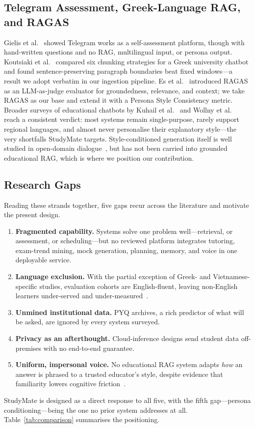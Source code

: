 \documentclass[conference]{IEEEtran}
\begin{document}
\subsection{Telegram Assessment, Greek-Language RAG, and RAGAS}
Gielis et al.~\cite{gielis2025} showed Telegram works as a
self-assessment platform, though with hand-written questions and no RAG,
multilingual input, or persona output. Koutsiaki et al.~\cite{koutsiaki2025}
compared six chunking strategies for a Greek university chatbot and
found sentence-preserving paragraph boundaries beat fixed windows---a
result we adopt verbatim in our ingestion pipeline. Es et al.~\cite{es2025}
introduced RAGAS as an LLM-as-judge evaluator for groundedness,
relevance, and context; we take RAGAS as our base and extend it with a
Persona Style Consistency metric. Broader surveys of educational
chatbots by Kuhail et al.~\cite{kuhail2023} and Wollny et al.~\cite{wollny2021}
reach a consistent verdict: most systems remain single-purpose, rarely
support regional languages, and almost never personalise their
explanatory style---the very shortfalls StudyMate targets.
Style-conditioned generation itself is well studied in open-domain
dialogue~\cite{li2023}, but has not been carried into grounded
educational RAG, which is where we position our contribution.

\subsection{Research Gaps}
Reading these strands together, five gaps recur across the literature
and motivate the present design.
\begin{enumerate}
    \item \textbf{Fragmented capability.} Systems solve one problem
          well---retrieval, or assessment, or scheduling---but no
          reviewed platform integrates tutoring, exam-trend mining,
          mock generation, planning, memory, and voice in one
          deployable service.
    \item \textbf{Language exclusion.} With the partial exception of
          Greek- and Vietnamese-specific studies, evaluation cohorts
          are English-fluent, leaving non-English learners
          under-served and under-measured~\cite{kuhail2023,wollny2021}.
    \item \textbf{Unmined institutional data.} PYQ archives, a rich
          predictor of what will be asked, are ignored by every system
          surveyed.
    \item \textbf{Privacy as an afterthought.} Cloud-inference designs
          send student data off-premises with no end-to-end guarantee.
    \item \textbf{Uniform, impersonal voice.} No educational RAG system
          adapts \emph{how} an answer is phrased to a trusted educator's
          style, despite evidence that familiarity lowers cognitive
          friction~\cite{zhao2024,li2023}.
\end{enumerate}
StudyMate is designed as a direct response to all five, with the fifth
gap---persona conditioning---being the one no prior system addresses at
all. Table~\ref{tab:comparison} summarises the positioning.
\end{document}
